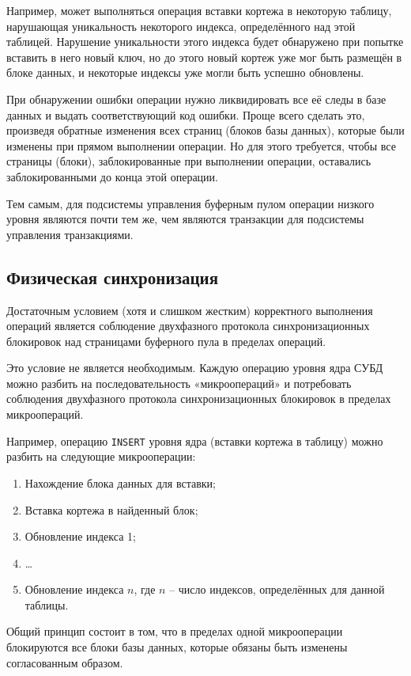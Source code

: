 \documentclass[a4paper,12pt]{article}
\begin{document}
Например, может выполняться операция вставки кортежа в некоторую таблицу, нарушающая уникальность некоторого индекса, определённого над этой таблицей. Нарушение уникальности этого индекса будет обнаружено при попытке вставить в него новый ключ, но до этого новый кортеж уже мог быть размещён в блоке данных, и некоторые индексы уже могли быть успешно обновлены.

При обнаружении ошибки операции нужно ликвидировать все её следы в базе данных и выдать соответствующий код ошибки. Проще всего сделать это, произведя обратные изменения всех страниц (блоков базы данных), которые были изменены при прямом выполнении операции. Но для этого требуется, чтобы все страницы (блоки), заблокированные при выполнении операции, оставались заблокированными до конца этой операции.

Тем самым, для подсистемы управления буферным пулом операции низкого уровня являются почти тем же, чем являются транзакции для подсистемы управления транзакциями.

\subsection{Физическая синхронизация}

Достаточным условием (хотя и слишком жестким) корректного выполнения операций является соблюдение двухфазного протокола синхронизационных блокировок над страницами буферного пула в пределах операций.

Это условие не является необходимым. Каждую операцию уровня ядра СУБД можно разбить на последовательность «микроопераций» и потребовать соблюдения двухфазного протокола синхронизационных блокировок в пределах микроопераций.

Например, операцию \texttt{INSERT} уровня ядра (вставки кортежа в таблицу) можно разбить на следующие микрооперации:
\begin{enumerate}
    \item Нахождение блока данных для вставки;
    \item Вставка кортежа в найденный блок;
    \item Обновление индекса 1;
    \item \dots
    \item Обновление индекса $n$, где $n$ – число индексов, определённых для данной таблицы.
\end{enumerate}

Общий принцип состоит в том, что в пределах одной микрооперации блокируются все блоки базы данных, которые обязаны быть изменены согласованным образом.
\end{document}
